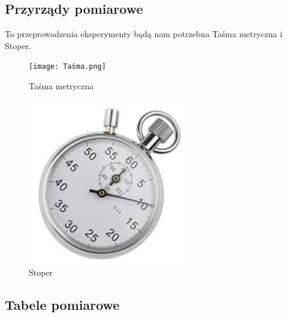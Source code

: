 \documentclass{article}
\begin{document}
\subsection{Przyrządy pomiarowe}
To przeprowadzenia eksperymenty bądą nam potrzebna Taśma metryczna i Stoper.
\begin{figure}[h]
  \centering
  \begin{minipage}[b]{0.4\textwidth}
    \texttt{[image: Taśma.png]}
    \caption{Taśma metryczna}
  \end{minipage}
  \hfill
  \begin{minipage}[b]{0.4\textwidth}
    \includegraphics[width=\textwidth]{Stoper.png}
    \caption{Stoper}
  \end{minipage}
\end{figure}

\subsection{Tabele pomiarowe}
\end{document}
